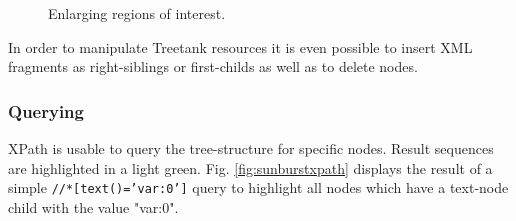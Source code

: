 \begin{itemize}
\begin{figure}
\centering
{}
\caption{Enlarging regions of interest.}
\end{figure}

In order to manipulate Treetank resources it is even possible to insert XML fragments as right-siblings or first-childs as well as to delete nodes.

\subsubsection{Querying}
XPath is usable to query the tree-structure for specific nodes. Result sequences are highlighted in a light green. Fig. \ref{fig:sunburstxpath} displays the result of a simple \texttt{//*[text()='var:0']} query to highlight all nodes which have a text-node child with the value "var:0".


\end{itemize}
